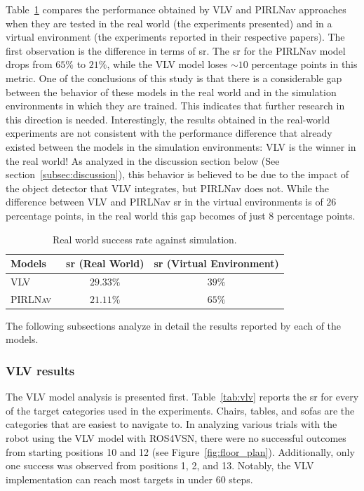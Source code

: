 Table~\ref{tab:results_sota} compares the performance obtained by VLV and PIRLNav approaches when they are tested in the real world (\ie the experiments presented) and in a virtual environment (\ie the experiments reported in their respective papers).
The first observation is the difference in terms of \acrshort{sr}\@.
The \acrshort{sr} for the PIRLNav model drops from $65\%$ to $21\%$, while the VLV model loses $\sim10$ percentage points in this metric.
One of the conclusions of this study is that there is a considerable gap between the behavior of these models in the real world and in the simulation environments in which they are trained.
This indicates that further research in this direction is needed.
Interestingly, the results obtained in the real-world experiments are not consistent with the performance difference that already existed between the models in the simulation environments: VLV is the winner in the real world!
As analyzed in the discussion section below (See section~\ref{subsec:discussion}), this behavior is believed to be due to the impact of the object detector that VLV integrates, but PIRLNav does not.
While the difference between VLV and PIRLNav \acrshort{sr} in the virtual environments is of $26$ percentage points, in the real world this gap becomes of just $8$ percentage points.

\begin{table}
    \centering
    \begin{tabular}{l|cc}
        \toprule
        \textbf{Models} & \acrshort{sr} (Real World) & \acrshort{sr} (Virtual Environment) \\
        \midrule
        \textsc{VLV}~\cite{chang2020} & $29.33\%$ & $39\%$ \\
        \textsc{PIRLNav}~\cite{ramrakhya2023} & $21.11\%$ & $65\%$ \\
        \bottomrule
    \end{tabular}
    \caption{Real world success rate against simulation.}
    \label{tab:results_sota}
\end{table}

The following subsections analyze in detail the results reported by each of the models.

\subsubsection{VLV results}
\label{subsubsec:vlv_results}

The VLV model analysis is presented first.
Table~\ref{tab:vlv} reports the \acrshort{sr} for every of the target categories used in the experiments.
Chairs, tables, and sofas are the categories that are easiest to navigate to.
In analyzing various trials with the robot using the VLV model with ROS4VSN, there were no successful outcomes from starting positions 10 and 12 (see Figure~\ref{fig:floor_plan}).
Additionally, only one success was observed from positions 1, 2, and 13.
Notably, the VLV implementation can reach most targets in under 60 steps.


